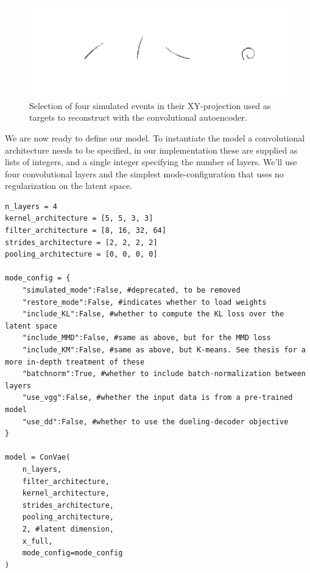 \begin{figure}[H]
\centering
\includegraphics[width=\textwidth]{sim_events.pdf}
\caption[simulated events]{Selection of four simulated events in their XY-projection used as targets to reconstruct with the convolutional autoencoder.}\label{fig:sim_data}
\end{figure}

\noindent We are now ready to define our model. To instantiate the model a convolutional architecture needs to be specified, in our implementation these are supplied as lists of integers, and a single integer specifying the number of layers. We'll use four convolutional layers and the simplest mode-configuration that uses no regularization on the latent space.  

\begin{minipage}{\linewidth}
\begin{lstlisting}[language=iPython]
n_layers = 4
kernel_architecture = [5, 5, 3, 3]
filter_architecture = [8, 16, 32, 64]
strides_architecture = [2, 2, 2, 2]
pooling_architecture = [0, 0, 0, 0]

mode_config = {
    "simulated_mode":False, #deprecated, to be removed
    "restore_mode":False, #indicates whether to load weights 
    "include_KL":False, #whether to compute the KL loss over the latent space
    "include_MMD":False, #same as above, but for the MMD loss
    "include_KM":False, #same as above, but K-means. See thesis for a more in-depth treatment of these
    "batchnorm":True, #whether to include batch-normalization between layers
    "use_vgg":False, #whether the input data is from a pre-trained model 
    "use_dd":False, #whether to use the dueling-decoder objective 
}

model = ConVae(
    n_layers,
    filter_architecture,
    kernel_architecture,
    strides_architecture,
    pooling_architecture,
    2, #latent dimension,
    x_full,
    mode_config=mode_config
)
\end{lstlisting}
\end{minipage}


